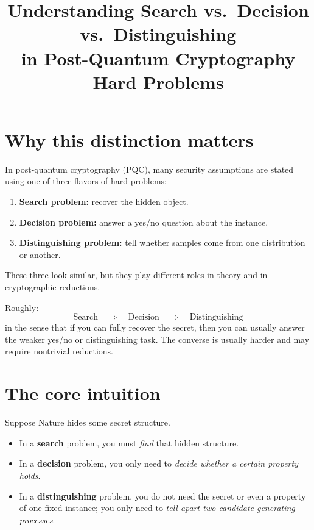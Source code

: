 \documentclass[11pt]{article}
\title{Understanding Search vs.\ Decision vs.\ Distinguishing\\
	in Post-Quantum Cryptography Hard Problems}
\author{}
\date{}
\begin{document}
	\maketitle
	
	\section{Why this distinction matters}
	
	In post-quantum cryptography (PQC), many security assumptions are stated using one of three flavors of hard problems:
	
	\begin{enumerate}[label=\arabic*.]
		\item \textbf{Search problem:} recover the hidden object.
		\item \textbf{Decision problem:} answer a yes/no question about the instance.
		\item \textbf{Distinguishing problem:} tell whether samples come from one distribution or another.
	\end{enumerate}
	
	These three look similar, but they play different roles in theory and in cryptographic reductions.
	
	\medskip
	
	\noindent
	Roughly:
	\[
	\text{Search} \quad \Rightarrow \quad \text{Decision} \quad \Rightarrow \quad \text{Distinguishing}
	\]
	in the sense that if you can fully recover the secret, then you can usually answer the weaker yes/no or distinguishing task. The converse is usually harder and may require nontrivial reductions.
	
	\section{The core intuition}
	
	Suppose Nature hides some secret structure.
	
	\begin{itemize}
		\item In a \textbf{search} problem, you must \emph{find} that hidden structure.
		\item In a \textbf{decision} problem, you only need to \emph{decide whether a certain property holds}.
		\item In a \textbf{distinguishing} problem, you do not need the secret or even a property of one fixed instance; you only need to \emph{tell apart two candidate generating processes}.
	\end{itemize}
	
\end{document}
